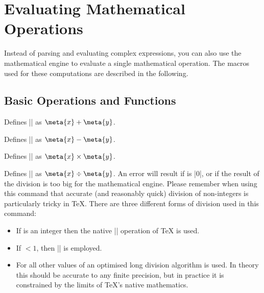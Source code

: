 %
%
%

\section{Evaluating Mathematical Operations}

\label{pgfmath-commands}

Instead of parsing and evaluating complex expressions, you can also
use the mathematical engine to evaluate a single mathematical
operation. The macros used for these computations are described in the
following. 


\subsection{Basic Operations and Functions}

\label{pgfmath-operations}

\begin{command}{\pgfmathadd{}}  
	Defines |\pgfmathresult| as $\meta{x}+\meta{y}$.
\end{command}

\begin{command}{\pgfmathsubtract{}}      
	Defines |\pgfmathresult| as $\meta{x}-\meta{y}$.                                       
\end{command}

\begin{command}{\pgfmathmultiply{}}      
	Defines |\pgfmathresult| as $\meta{x}\times\meta{y}$.                                
\end{command}

\begin{command}{\pgfmathdivide{}}        
	Defines |\pgfmathresult| as $\meta{x}\div\meta{y}$. An error will
	result if  is	|0|, or if the result of the division is
	too big for the mathematical engine.
	Please remember	when using this command that accurate (and reasonably 
	quick) division of non-integers is particularly tricky in \TeX{}. 	
	There are three different forms of division used in this command:
	\begin{itemize}
		\item 
		If  is an integer then the native |\divide| operation of 
		\TeX{} is used.
		\item
		If \vrule{}\vrule$<1$, then |\pgfmathreciprocal| is employed.
		\item
		For all other values of  an optimised long division 
		algorithm is used. In theory this should be accurate
		to any finite precision, but in practice it is constrained by the
		limits of \TeX{}'s native mathematics.
	\end{itemize}
	                             
\end{command}

